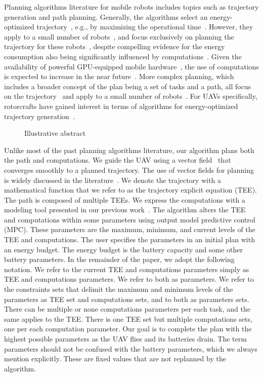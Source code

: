 \documentclass[letterpaper,10pt,conference]{ieeeconf}
\newcommand{\figpath}{./figures}
\theoremstyle{definition}
\begin{document}
Planning algorithms literature for mobile robots includes topics such as trajectory generation and path planning. Generally, the algorithms select an energy-optimized trajectory~\cite{mei2004energy}, e.g., by maximizing the operational time~\cite{wahab2015energy}. However, they apply to a small number of robots~\cite{kim2005energy}, and focus exclusively on planning the trajectory for these robots~\cite{kim2008minimum}, despite compelling evidence for the energy consumption also being significantly influenced by computations~\cite{mei2005case}. Given the availability of powerful GPU-equipped mobile hardware~\cite{rizvi2017general}, the use of computations is expected to increase in the near future~\cite{abramov2012real,satria2016real,jaramillo2019visual}. More complex planning, which includes a broader concept of the plan being a set of tasks and a path, all focus on the trajectory~\cite{mei2005case,mei2006deployment} and apply to a small number of robots~\cite{sadrpour2013mission,sadrpour2013experimental}. For UAVs specifically, rotorcrafts have gained interest in terms of algorithms for energy-optimized trajectory generation~\cite{morbidi2016minimum,kreciglowa2017energy}. 

\begin{figure}[t]
  \centering
  
  \caption{Illustrative abstract}
  \label{fig:il-abs}
\end{figure}

Unlike most of the past planning algorithms literature, our algorithm plans both the path and computations. We guide the UAV using a vector field~\cite{de2017guidance} that converges smoothly to a planned trajectory. The use of vector fields for planning is widely discussed in the literature~\cite{lindemann2005smoothly,gonccalves2010vector,panagou2014motion,zhou2014vector,kapitanyuk2017guiding,de2017guidance}. We denote the trajectory with a mathematical function that we refer to as the trajectory explicit equation (TEE). The path is composed of multiple TEEs. We express the computations with a modeling tool presented in our previous work~\cite{seewald2019coarse}. The algorithm alters the TEE and computations within some parameters using output model predictive control (MPC). These parameters are the maximum, minimum, and current levels of the TEE and computations. The user specifies the parameters in an initial plan with an energy budget. The energy budget is the battery capacity and some other battery parameters. In the remainder of the paper, we adopt the following notation. We refer to the current TEE and computations parameters simply as TEE and computations parameters. We refer to both as parameters. We refer to the constraints sets that delimit the maximum and minimum levels of the parameters as TEE set and computations sets, and to both as parameters sets. There can be multiple or none computations parameters per each task, and the same applies to the TEE. There is one TEE set but multiple computations sets, one per each computation parameter. Our goal is to complete the plan with the highest possible parameters as the UAV flies and its batteries drain. The term parameters should not be confused with the battery parameters, which we always mention explicitly. These are fixed values that are not replanned by the algorithm.
\end{document}
